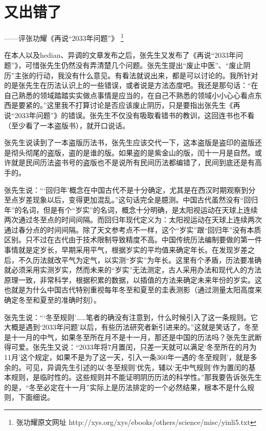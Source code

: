\section{又出错了}
\centerline{\yuesong ——评张功耀《再说“2033年问题”》
\footnote{张功耀原文网址 http://xys.org/xys/ebooks/others/science/misc/yinli5.txt}}

\mbox{}

在本人以及hedian、异调的文章发布之后，张先生又发布了《再说“2033年问题”》，可惜张先生仍然没有弄清楚几个问题。张先生提出“废止中医”、“废止阴历”主张的行动，我没有什么意见。有看法就说出来，都是可以讨论的。我所针对的是张先生在历法认识上的一些错误，或者说是方法态度吧。我还是那句话：“在
自己熟悉的领域踏踏实实做点事情是应当的，在自己不熟悉的领域小小心心看点东西是要紧的。”这里我不打算讨论是否应该废止阴历，只是要指出张先生《再说“2033年问题”》的错误。张先生不仅没有吸取看错书的教训，这回连书也不看（至少看了一本盗版书），就开口说话。

张先生说读到了一本盗版历法书，张先生应该交代一下，这本盗版是盗印的盗版还是彻头彻尾的盗版，盗的是谁的版。如果盗的是紫金山的版，闰十一月是自然。或许就是民间历法盗书号的盗版也不是说所有民间历法都编错了，民间到底还是有高手的。

张先生说：“‘回归年’概念在中国古代不是十分确定，尤其是在西汉时期观察到分至点岁差现象以后，变得更加混乱。”这句话完全是臆测。中国古代虽然没有“回归年”的名词，但是有个“岁实”的名词，概念十分明确，是太阳视运动在天球上连续两次通过冬至点的时间间隔。而回归年现代定义为：太阳视运动在天球上连续两次通过春分点的时间间隔。除了天文参考点不一样，这个“岁实”跟“回归年”没有本质区别。只不过在古代由于技术限制导致精度不高。中国传统历法编制要做的第一件事情就是定岁长，早期采用平气，根据岁实的平均值来确定年长。在发现岁差之后，不久历法就改平气为定气，以实测“岁实”为年长。这里有个矛盾，历法要准确就必须采用实测岁实，然而未来的“岁实”无法测定，古人采用办法和现代人的方法原理一致，非常科学，根据积累的数据，以插值的方法来确定未来年份的岁实。这也就是为什么中国古代特别重视每年冬至和夏至的圭表测影（通过测量太阳高度来确定冬至和夏至的准确时刻）。

张先生说：“‘冬至规则’……笔者的确没有注意到，什么时候引入了这一条规则。它大概是遇到‘2033年问题’以后，有些历法研究者新引进来的。”这就是笑话了，冬至是十一月的中气，如果冬至所在月不是十一月，那还是中国的历法吗？张先生武断得可爱。张先生又说：“2033年将7月置闰，只差一天就可以满足‘冬至所在的月为11月’这个规定，如果不是为了这一天，引入一条360年一遇的‘冬至规则’，就是多余的。可见，异调先生引述的以‘冬至规则’优先，辅以‘无中气规则’作为置闰的基本规则，是临时性的。这些规则并不能证明阴历历法的科学性。”那我要告诉张先生的是，“冬至必定在十一月”实际上是历法排定的一个必然结果，根本不是什么规则，下面细说。

